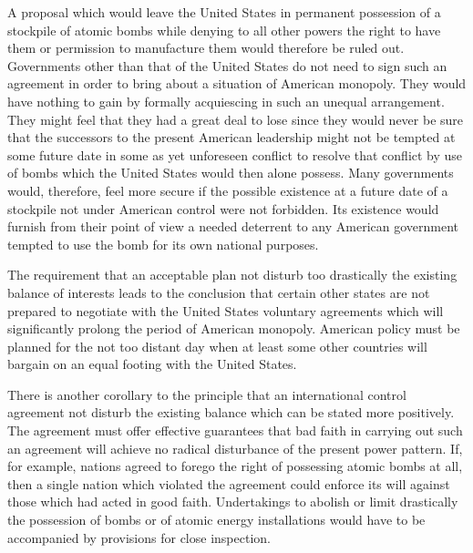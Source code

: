 A proposal which would leave the United States in permanent possession of a  stockpile of atomic bombs while denying to all other powers the right to have them or permission to manufacture them would therefore be ruled out. Governments other than that of the United States do not need to sign such an agreement in order to bring about a situation of American monopoly. They would have nothing to gain by formally acquiescing in such an unequal arrangement. They might feel that they had a great deal to lose since they would never be sure that the successors to the present American leadership might not be tempted at some future date in some as yet unforeseen conflict to resolve that conflict by use of bombs which the United States would then alone possess. Many governments would, therefore, feel more secure if the possible existence at a future date of a stockpile not under American control were not forbidden. Its existence would furnish from their point of view a needed deterrent to any American government tempted to use the bomb for its own national purposes.

The requirement that an acceptable plan not disturb too drastically the existing balance of interests leads to the conclusion that certain other states are not prepared to negotiate with the United States voluntary agreements which will significantly prolong the period of American monopoly. American policy must be planned for the not too distant day when at least some other countries will bargain on an equal footing with the United States.

There is another corollary to the principle that an international control agreement not disturb the existing balance which can be stated more positively. The agreement must offer effective guarantees that bad faith in carrying out such an agreement will achieve no radical disturbance of the present power pattern. If, for example, nations agreed to forego the right of possessing atomic bombs at all, then a single nation which violated the agreement could enforce its will against those which had acted in good faith. Undertakings to abolish or limit drastically the possession of bombs or of atomic energy installations would have to be accompanied by provisions for close inspection.

\label{V-narco1}

